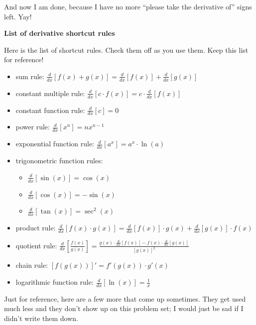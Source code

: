 \documentclass[letter, 12pt]{article}
\renewcommand{\section}[1]{\begin{center} \textbf{#1} \\\end{center}}
\newcommand{\diff}[1]{\frac{d}{d#1}}
\begin{document}
And now I am done, because I have no more ``please take the derivative of'' signs left. Yay!

\pagebreak

\section{List of derivative shortcut rules}

Here is the list of shortcut rules. Check them off as you use them. Keep this list for reference!
{ \everymath{\displaystyle}
    \begin{itemize}[label=\(\square\)]
        \item sum rule: $\diff{x}[f(x)+g(x)] = \diff{x}[f(x)]+\diff{x}[g(x)]$ 
        \item constant multiple rule: $\diff{x}[c\cdot f(x)] = c\cdot\diff{x}[f(x)]$
        \item constant function rule: $\diff{x}[c] = 0$
        \item power rule: $\diff{x}[x^n] = nx^{n-1}$
        \item exponential function rule: $\diff{x}[a^x] = a^x\cdot\ln(a)$
        \item[] trigonometric function rules: 
        \begin{itemize}[label=\(\bigcirc\)]
            \item $\diff{x}[\sin(x)] = \cos(x)$
            \item $\diff{x}[\cos(x)] = -\sin(x)$
            \item $\diff{x}[\tan(x)] = \sec^2(x)$
        \end{itemize}
        \item product rule: $\diff{x}[f(x) \cdot g(x)] = \diff{x}[f(x)] \cdot g(x) + \diff{x}[g(x)] \cdot f(x)$
        \item quotient rule: $\diff{x}\left[\frac{f(x)}{g(x)}\right] 
        = \frac{g(x) \cdot \diff{x}[f(x)] - f(x) \cdot \diff{x}[g(x)]}{[g(x)]^2}$
        \item chain rule: $[f(g(x))]' = f'(g(x)) \cdot g'(x)$
        \item logarithmic function rule: $\diff{x}[\ln(x)] = \frac{1}{x}$
    \end{itemize}
    \hrulefill

    Just for reference, here are a few more that come up sometimes. They get used much less and they don't show up on this problem set; I would just be sad if I didn't write them down.
    \begin{multicols}{2}
        

\end{multicols}}
\end{document}

